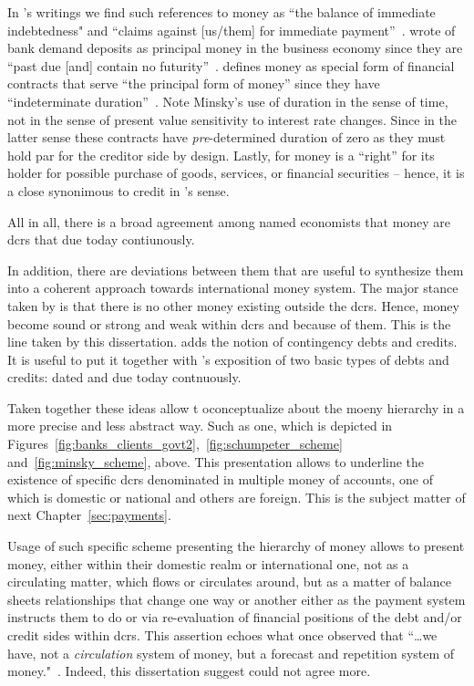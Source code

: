 In \citeauthor{keynes1930a}'s writings we find such references to money as ``the balance of immediate indebtedness" and ``claims against [us/them] for immediate payment''~\citep[pp.~13,16]{keynes1971_1}. \citeauthor{commons1936} wrote of bank demand deposits as principal money in the business economy since they are ``past due [and] contain no futurity''~\citep[p.~529]{tymoigne2003}. \cite{minsky1986} defines money as special form of financial contracts that serve ``the principal form of money'' since they have ``indeterminate duration''~\citep[p.~225]{minsky1986}. Note Minsky's use of duration in the sense of time, not in the sense of present value sensitivity to interest rate changes. Since in the latter sense these contracts have \textit{pre}-determined duration of zero as they must hold par for the creditor side by design. Lastly, for \citeauthor{schumacher1939} money is a ``right'' for its holder for possible purchase of goods, services, or financial securities -- hence, it is a close synonimous to credit in \citeauthor{innes1913}'s sense.

All in all, there is a broad agreement among named economists that money are \acfp{dcr} that due today contiunously. 

In addition, there are deviations between them that are useful to synthesize them into a coherent approach towards international money system. The major stance taken by \citeauthor{innes1913} is that there is no other money existing outside the \acp{dcr}. Hence, money become sound or strong and weak within \acp{dcr} and because of them. This is the line taken by this dissertation. \cite{minsky1986} adds the notion of contingency debts and credits. It is useful to put it together with \citeauthor{innes1913}'s exposition of two basic types of debts and credits: dated and due today contnuously. 

Taken together these ideas allow t oconceptualize about the moeny hierarchy in a more precise and less abstract way. Such as one, which is depicted in Figures~\ref{fig:banks_clients_govt2},~\ref{fig:schumpeter_scheme} and~\ref{fig:minsky_scheme}, above. This presentation allows to underline the existence of specific \acp{dcr} denominated in multiple money of accounts, one of which is domestic or national and others are foreign. This is the subject matter of next Chapter~\ref{sec:payments}.

Usage of such specific scheme presenting the hierarchy of money allows to present money, either within their domestic realm or international one, not as a circulating matter, which flows or circulates around, but as a matter of balance sheets relationships that change one way or another either as the payment system instructs them to do or via re-evaluation of financial positions of the debt and/or credit sides within \acp{dcr}. This assertion echoes what \citeauthor{commons1951} once observed that ``\dots we have, not a \textit{circulation} system of money, but a forecast and repetition system of money."~\citep[as quoted in][p.~11161, emphasis original]{whalen1993}. Indeed, this dissertation suggest \citeauthor{innes1913} could not agree more.